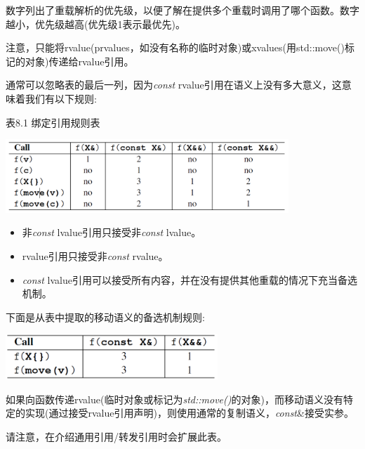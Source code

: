 数字列出了重载解析的优先级，以便了解在提供多个重载时调用了哪个函数。数字越小，优先级越高(优先级1表示最优先)。\par

注意，只能将rvalue(prvalues，如没有名称的临时对象)或xvalues(用std::move()标记的对象)传递给rvalue引用。\par

通常可以忽略表的最后一列，因为\textit{const} rvalue引用在语义上没有多大意义，这意味着我们有以下规则:\par

\hspace*{\fill} \par %
表8.1 绑定引用规则表

\begin{center}
	\includegraphics[width=0.8\textwidth]{content/1/chapter8/images/3}
\end{center}

\begin{itemize}
	\item 非\textit{const} lvalue引用只接受非\textit{const} lvalue。 
	\item rvalue引用只接受非\textit{const} rvalue。
	\item \textit{const} lvalue引用可以接受所有内容，并在没有提供其他重载的情况下充当备选机制。
\end{itemize}

下面是从表中提取的移动语义的备选机制规则:\par

\begin{center}
	\includegraphics[width=0.6\textwidth]{content/1/chapter8/images/4}
\end{center}

如果向函数传递rvalue(临时对象或标记为\textit{std::move()}的对象)，而移动语义没有特定的实现(通过接受rvalue引用声明)，则使用通常的复制语义，\textit{const}\&接受实参。\par

请注意，在介绍通用引用/转发引用时会扩展此表。\par

